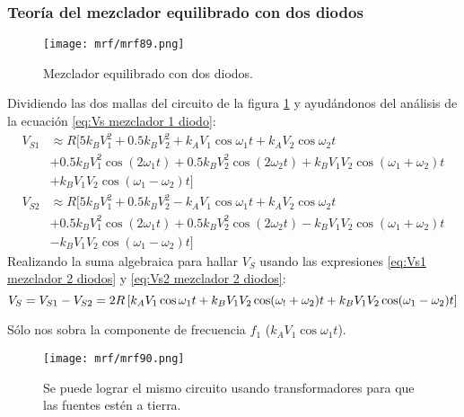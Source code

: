 \documentclass[
	12pt, %
	fleqn, %
	a4paper, %
	oneside, %
]{LegrandOrangeBook}
\begin{document}
\subsubsection{Teoría del mezclador equilibrado con dos diodos}
\begin{figure}[H]
\centering
\texttt{[image: mrf/mrf89.png]}
\caption{Mezclador equilibrado con dos diodos.}
\label{fig:mezc equi 2 diodos}
\end{figure}
Dividiendo las dos mallas del circuito de la figura \ref{fig:mezc equi 2 diodos} y ayudándonos del análisis de la ecuación \ref{eq:Vs mezclador 1 diodo}:
\begin{equation}
    \begin{split}
        V_{S1}&\approx R[5k_BV_1^2+0.5k_BV_2^2+k_AV_1\cos\omega_1t+k_AV_2\cos\omega_2t\\
&+0.5k_BV_1^2\cos(2\omega_1t)+0.5k_BV_2^2\cos(2\omega_2t)+k_BV_1V_2\cos(\omega_1+\omega_2)t\\
&+k_BV_1V_2\cos(\omega_1-\omega_2)t]
    \end{split}
    \label{eq:Vs1 mezclador 2 diodos}
\end{equation}
\begin{equation}
    \begin{split}
        V_{S2}&\approx R[5k_BV_1^2+0.5k_BV_2^2-k_AV_1\cos\omega_1t+k_AV_2\cos\omega_2t\\
&+0.5k_BV_1^2\cos(2\omega_1t)+0.5k_BV_2^2\cos(2\omega_2t)-k_BV_1V_2\cos(\omega_1+\omega_2)t\\
&-k_BV_1V_2\cos(\omega_1-\omega_2)t]
    \end{split}
    \label{eq:Vs2 mezclador 2 diodos}
\end{equation}
Realizando la suma algebraica para hallar $V_S$ usando las expresiones \ref{eq:Vs1 mezclador 2 diodos} y \ref{eq:Vs2 mezclador 2 diodos}:
\begin{equation}
V_S=V_{S1}-V_{S2}=2R\left[k_AV_1\cos\omega_1t+k_BV_1V_2\cos(\omega_!+\omega_2)t+k_BV_1V_2\cos(\omega_1-\omega_2)t\right]
\end{equation}
\begin{notation}
Sólo nos sobra la componente de frecuencia $f_1$ ($k_AV_1\cos\omega_1t$).
\end{notation}
\begin{figure}[H]
\centering
\texttt{[image: mrf/mrf90.png]}
\caption{Se puede lograr el mismo circuito usando transformadores para que las fuentes estén a tierra.}
\end{figure}
\end{document}
